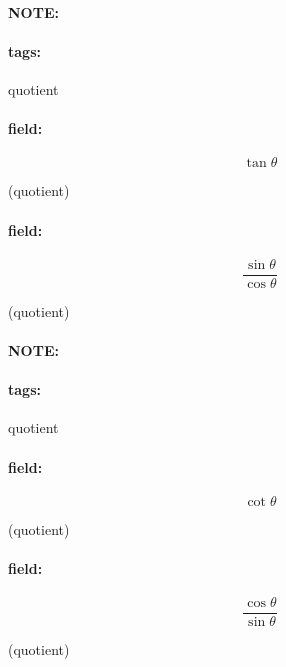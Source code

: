 \documentclass[12pt]{article}
\newenvironment{note}{\paragraph{NOTE:}}{}
\newenvironment{field}{\paragraph{field:}}{}
\newcommand*{\tags}[1]{\paragraph{tags: }#1}
\begin{document}
\begin{note}
    \tags{quotient}
    \begin{field}
    \[  
        \tan \theta
    \] 
    \begin{center}
    (quotient)
    \end{center}
    \end{field}
    \begin{field}
    \[
        \frac{\sin \theta}{\cos \theta}
    \] 
    \begin{center}
    (quotient)
    \end{center}
    \end{field}
\end{note}

\begin{note}
    \tags{quotient}
    \begin{field}
    \[  
        \cot \theta
    \] 
    \begin{center}
    (quotient)
    \end{center}
    \end{field}
    \begin{field}
    \[
        \frac{\cos \theta}{\sin \theta}
    \] 
    \begin{center}
    (quotient)
    \end{center}
    \end{field}
\end{note}
\end{document}
